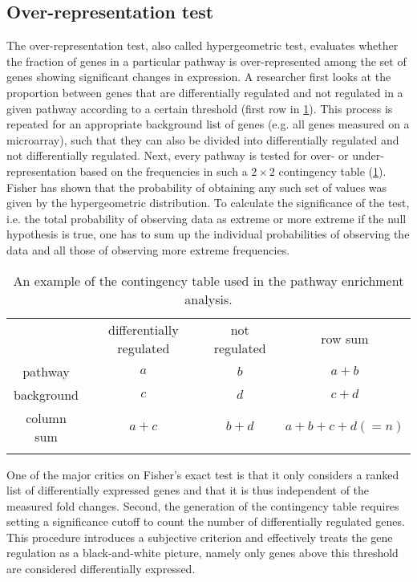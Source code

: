 \subsection{Over-representation test}
The over-representation test, also called hypergeometric test, 
evaluates whether the fraction of genes in a particular pathway is over-represented among the set 
of genes showing significant changes in expression. 
A researcher first looks at the proportion between genes 
that are 
differentially regulated and not regulated in a given 
pathway according to a certain 
threshold (first row in \ref{table:contigency_table}). 
This process is repeated for an appropriate background 
list of genes (e.g. all genes measured on a microarray), 
such that they can also be divided into differentially 
regulated and not differentially regulated. 
Next, every pathway 
is tested for over- or under-representation based on the frequencies in such 
a $2 \times 2$ contingency table (\ref{table:contigency_table}). 
Fisher has shown that the probability of obtaining any such set of values was 
given by the hypergeometric distribution. To calculate the significance of the
test, i.e. the total probability of observing data as extreme or more extreme 
if the null hypothesis is true, one has to sum up the individual probabilities
of observing the data and all those of observing more extreme frequencies.

\begin{longtable}{cccc}
\caption[Contingency table example]{
An example of the contingency table used in the pathway enrichment analysis.} \\
\hline
& differentially regulated & not regulated & row sum \\
\rowcolor{Gray} pathway & $a$ & $b$ & $a+b$\\
background & $c$ & $d$ & $c+d$\\
\rowcolor{Gray} column sum & $a+c$ & $b+d$ & $a+b+c+d(=n)$\\
\hline
\label{table:contigency_table}
\end{longtable}

One of the major critics on Fisher's exact test is that it only considers a ranked
list of differentially expressed genes and that it is thus independent of the 
measured fold changes. Second, the generation of the contingency table
requires setting a significance cutoff to count the number of differentially
regulated genes. This procedure introduces a subjective criterion and 
effectively treats the gene regulation as a black-and-white picture, namely only 
genes above this threshold are considered differentially expressed.
    
